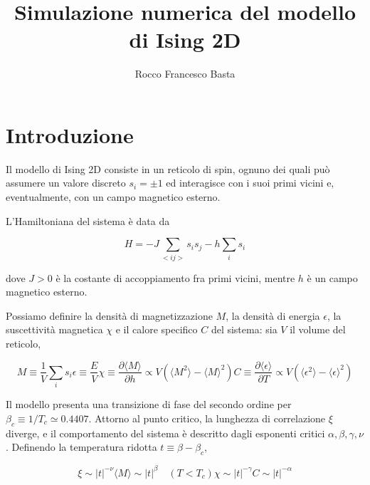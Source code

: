 \documentclass[a4paper,11pt]{article}
\title{Simulazione numerica del modello di Ising 2D}
\author{Rocco Francesco Basta}
\date{}
\newcommand{\avg}[1]{\langle {#1} \rangle}
\begin{document}
	\maketitle
	\section{Introduzione}
		Il modello di Ising 2D consiste in un reticolo di spin, ognuno dei quali può assumere un valore discreto $s_i = \pm 1$ ed interagisce con i suoi primi vicini e, eventualmente, con un campo magnetico esterno.

		L'Hamiltoniana del sistema è data da

		\begin{equation}
			H = -J\sum_{<ij>} s_i s_j - h \sum_i s_i
		\end{equation}

		dove $J > 0$ è la costante di accoppiamento fra primi vicini, mentre $h$ è un campo magnetico esterno.

		Possiamo definire la densità di magnetizzazione $M$, la densità di
		energia $\epsilon$, la suscettività magnetica $\chi$ e il calore
		specifico $C$ del sistema: sia $V$ il volume del reticolo,

		\begin{subequations}
		\begin{equation}
			M \equiv \frac{1}{V} \sum_i s_i
		\end{equation}
		\begin{equation}
			\epsilon \equiv \frac{E}{V}
		\end{equation}
		\begin{equation}
			\chi \equiv \frac{\partial \avg{M}}{\partial h} \propto V ( \avg{M^2} - \avg{M}^2)
		\end{equation}
		\begin{equation}
			C \equiv \frac{\partial \avg{\epsilon}}{\partial T} \propto V (\avg{\epsilon^2} - \avg{\epsilon}^2)
		\end{equation}

		\end{subequations}

		Il modello presenta una transizione di fase del secondo ordine per
		$\beta_c \equiv 1/T_{c} \simeq 0.4407$. Attorno al punto critico, la lunghezza di
		correlazione $\xi$ diverge, e il comportamento del sistema è descritto
		dagli esponenti critici $\alpha, \beta, \gamma, \nu$. Definendo la temperatura ridotta $t \equiv \beta - \beta_c$,

		\begin{subequations}
		\begin{equation}
			\xi \sim |t|^{-\nu} 
		\end{equation}
		\begin{equation}
			\avg{M} \sim |t|^\beta \quad (T < T_c) 
		\end{equation}
		\begin{equation}
			\chi \sim |t|^{-\gamma}
		\end{equation}
		\begin{equation}
			C \sim |t|^{-\alpha}
		\end{equation}
		\label{eqn:t_scaling}
		\end{subequations}
\end{document}
